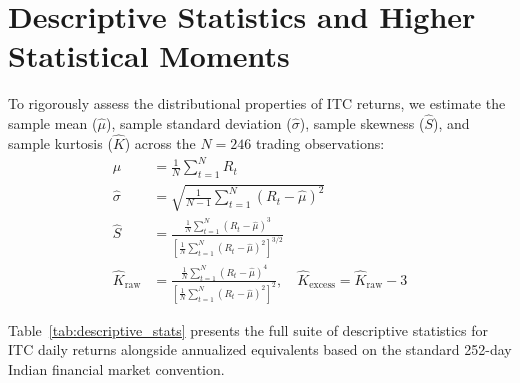 \section{Descriptive Statistics and Higher Statistical Moments}
\label{sec:descriptive_statistics}

To rigorously assess the distributional properties of ITC returns, we estimate the sample mean ($\hat{\mu}$), sample standard deviation ($\hat{\sigma}$), sample skewness ($\hat{S}$), and sample kurtosis ($\hat{K}$) across the $N = 246$ trading observations:
\begin{align}
\hat{\mu} &= \frac{1}{N} \sum_{t=1}^{N} R_t \label{eq:sample_mean} \\
\hat{\sigma} &= \sqrt{\frac{1}{N-1} \sum_{t=1}^{N} (R_t - \hat{\mu})^2} \label{eq:sample_std} \\
\hat{S} &= \frac{\frac{1}{N} \sum_{t=1}^{N} (R_t - \hat{\mu})^3}{\left[\frac{1}{N} \sum_{t=1}^{N} (R_t - \hat{\mu})^2\right]^{3/2}} \label{eq:sample_skew} \\
\hat{K}_{\text{raw}} &= \frac{\frac{1}{N} \sum_{t=1}^{N} (R_t - \hat{\mu})^4}{\left[\frac{1}{N} \sum_{t=1}^{N} (R_t - \hat{\mu})^2\right]^2}, \quad \hat{K}_{\text{excess}} = \hat{K}_{\text{raw}} - 3 \label{eq:sample_kurt}
\end{align}

Table~\ref{tab:descriptive_stats} presents the full suite of descriptive statistics for ITC daily returns alongside annualized equivalents based on the standard 252-day Indian financial market convention.

